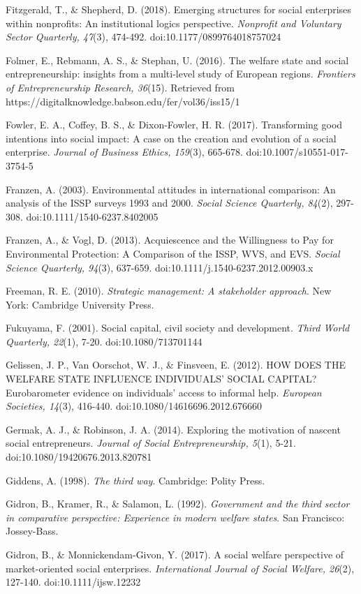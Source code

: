 \documentclass{article}
\begin{document}
Fitzgerald, T., \& Shepherd, D. (2018). Emerging structures for social enterprises within nonprofits: An institutional logics perspective. \emph{Nonprofit}\emph{ and Voluntary Sector Quarterly, 47}(3), 474-492. doi:10.1177/0899764018757024

Folmer, E., Rebmann, A. S., \& Stephan, U. (2016). The welfare state and social entrepreneurship: insights from a multi-level study of European regions. \emph{Frontiers of Entrepreneurship Research, 36}(15). Retrieved from https://digitalknowledge.babson.edu/fer/vol36/iss15/1

Fowler, E. A., Coffey, B. S., \& Dixon-Fowler, H. R. (2017). Transforming good intentions into social impact: A case on the creation and evolution of a social enterprise. \emph{Journal of Business Ethics, 159}(3), 665-678. doi:10.1007/s10551-017-3754-5

Franzen, A. (2003). Environmental attitudes in international comparison: An analysis of the ISSP surveys 1993 and 2000. \emph{Social Science Quarterly, 84}(2), 297-308. doi:10.1111/1540-6237.8402005

Franzen, A., \& Vogl, D. (2013). Acquiescence and the Willingness to Pay for Environmental Protection: A Comparison of the ISSP, WVS, and EVS. \emph{Social Science Quarterly, 94}(3), 637-659. doi:10.1111/j.1540-6237.2012.00903.x

Freeman, R. E. (2010). \emph{Strategic management: A stakeholder approach}. New York: Cambridge University Press.

Fukuyama, F. (2001). Social capital, civil society and development. \emph{Third World Quarterly, 22}(1), 7-20. doi:10.1080/713701144

Gelissen, J. P., Van Oorschot, W. J., \& Finsveen, E. (2012). HOW DOES THE WELFARE STATE INFLUENCE INDIVIDUALS' SOCIAL CAPITAL? Eurobarometer evidence on individuals' access to informal help. \emph{European Societies, 14}(3), 416-440. doi:10.1080/14616696.2012.676660

Germak, A. J., \& Robinson, J. A. (2014). Exploring the motivation of nascent social entrepreneurs. \emph{Journal of Social Entrepreneurship, 5}(1), 5-21. doi:10.1080/19420676.2013.820781

Giddens, A. (1998). \emph{The third way}. Cambridge: Polity Press.

Gidron, B., Kramer, R., \& Salamon, L. (1992). \emph{Government and the third sector in comparative perspective: Experience in modern welfare states}. San Francisco: Jossey-Bass.

Gidron, B., \& Monnickendam-Givon, Y. (2017). A social welfare perspective of market-oriented social enterprises. \emph{International Journal of Social Welfare, 26}(2), 127-140. doi:10.1111/ijsw.12232
\end{document}
